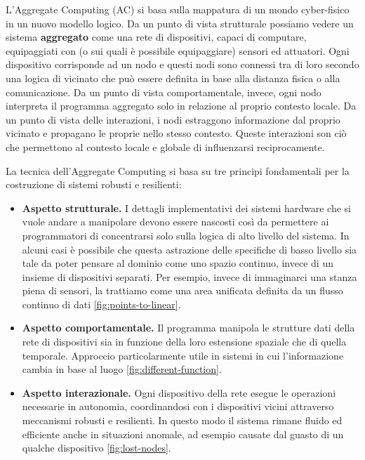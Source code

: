 \documentclass[12pt,a4paper,openright,twoside]{book}
\begin{document}
L'Aggregate Computing (AC) si basa sulla mappatura di un mondo cyber-fisico in un nuovo modello logico. Da un punto di vista strutturale possiamo vedere un sistema \textbf{aggregato} come una rete di dispositivi, capaci di computare, equipaggiati con (o sui quali è possibile equipaggiare) sensori ed attuatori. Ogni dispositivo corrisponde ad un nodo e questi nodi sono connessi tra di loro secondo una logica di vicinato che può essere definita in base alla distanza fisica o alla comunicazione. Da un punto di vista comportamentale, invece, ogni nodo interpreta il programma aggregato solo in relazione al proprio contesto locale. Da un punto di vista delle interazioni, i nodi estraggono informazione dal proprio vicinato e propagano le proprie nello stesso contesto. Queste interazioni son ciò che permettono al contesto locale e globale di influenzarsi reciprocamente.

La tecnica dell'Aggregate Computing si basa su tre principi fondamentali per la costruzione di sistemi robusti e resilienti:

\begin{itemize}
    \item \textbf{Aspetto strutturale.} I dettagli implementativi dei sistemi hardware che si vuole andare a manipolare devono essere nascosti così da permettere ai programmatori di concentrarsi solo sulla logica di alto livello del sistema. In alcuni casi è possibile che questa astrazione delle specifiche di basso livello sia tale da poter pensare al dominio come uno spazio continuo, invece di un insieme di dispositivi separati. Per esempio, invece di immaginarci una stanza piena di sensori, la trattiamo come una area unificata definita da un flusso continuo di dati \cref{fig:points-to-linear}.
    \item \textbf{Aspetto comportamentale.} Il programma manipola le strutture dati della rete di dispositivi sia in funzione della loro estensione spaziale che di quella temporale. Approccio particolarmente utile in sistemi in cui l'informazione cambia in base al luogo \cref{fig:different-function}.
    \item \textbf{Aspetto interazionale.} Ogni dispositivo della rete esegue le operazioni necessarie in autonomia, coordinandosi con i dispositivi vicini attraverso meccanismi robusti e resilienti. In questo modo il sistema rimane fluido ed efficiente anche in situazioni anomale, ad esempio causate dal guasto di un qualche dispositivo \cref{fig:lost-nodes}.
\end{itemize}
\end{document}

